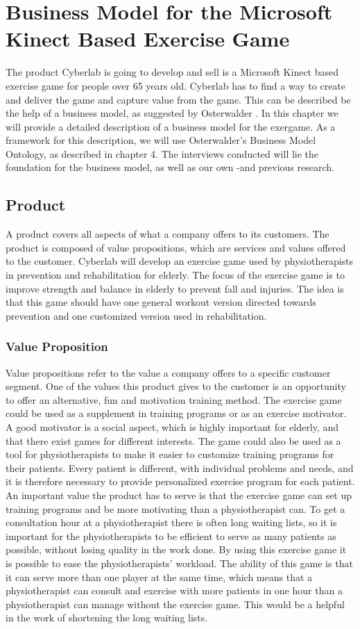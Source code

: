 \chapter{Business Model for the Microsoft Kinect Based Exercise Game}
The product Cyberlab is going to develop and sell is a Microsoft Kinect based exercise game for people over 65 years old. Cyberlab has to find a way to create and deliver the game and capture value from the game. This can be described be the help of a business model, as suggested by Osterwalder \cite{osterwalder}. In this chapter we will provide a detailed description of a business model for the exergame. As a framework for this description, we will use Osterwalder's Business Model Ontology, as described in chapter 4. The interviews conducted will lie the foundation for the business model, as well as our own -and previous research. 

\section{Product}
A product covers all aspects of what a company offers to its customers. The product is composed of value propositions, which are services and values offered to the customer. Cyberlab will develop an exercise game used by physiotherapists in prevention and rehabilitation for elderly. The focus of the exercise game is to improve strength and balance in elderly to prevent fall and injuries. The idea is that this game should have one general workout version directed towards prevention and one customized version used in rehabilitation.
\subsection{Value Proposition}
Value propositions refer to the value a company offers to a specific customer segment. One of the values this product gives to the customer is an opportunity to offer an alternative, fun and motivation training method. The exercise game could be used as a supplement in training programs or as an exercise motivator. A good motivator is a social aspect, which is highly important for elderly, and that there exist games for different interests. The game could also be used as a tool for physiotherapists to make it easier to customize training programs for their patients. Every patient is different, with individual problems and needs, and it is therefore necessary to provide personalized exercise program for each patient. An important value the product has to serve is that the exercise game can set up training programs and be more motivating than a physiotherapist can. To get a consultation hour at a physiotherapist there is often long waiting lists, so it is important for the physiotherapists to be efficient to serve as many patients as possible, without losing quality in the work done. By using this exercise game it is possible to ease the physiotherapists’ workload. The ability of this game is that it can serve more than one player at the same time, which means that a physiotherapist can consult and exercise with more patients in one hour than a physiotherapist can manage without the exercise game. This would be a helpful in the work of shortening the long waiting lists.
